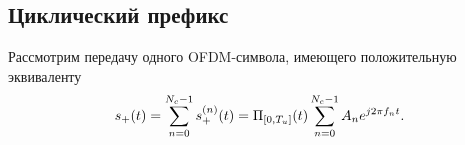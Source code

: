 \documentclass{book}
\numberwithin{theorem}{chapter}
\numberwithin{statement}{chapter}
\numberwithin{lemma}{chapter}
\theoremstyle{definition}
\numberwithin{task}{chapter}
\theoremstyle{remark}
\numberwithin{example}{chapter}
\theoremstyle{definition}
\numberwithin{definition}{chapter}
\theoremstyle{remark}
\theoremstyle{remark}
\numberwithin{lyrics}{section}
\begin{document}
\begin{figure}
\begin{tikzpicture}[xscale=1, yscale=1, domain=\FromFrequency:\ToFrequency]
	
%
%
%
\end{tikzpicture}
\end{figure}


\subsection{Циклический префикс}
\label{sec:phy:ofdm:cyclic}
Рассмотрим передачу одного OFDM-символа, имеющего положительную эквиваленту
\begin{equation}
s_{+}(t) = \Sum_{n = 0}^{N_c - 1}s^{(n)}_{+}(t) =  \Pi_{[0, T_u]}(t)  \Sum_{n = 0}^{N_c - 1} \symb_n e^{j2\pi \Freq_n t}.
\end{equation}
\end{document}
